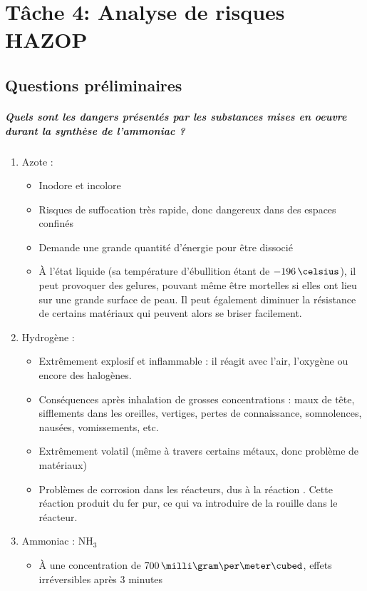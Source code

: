 \chapter{Tâche 4: Analyse de risques HAZOP}

\section{Questions préliminaires}
\paragraph{Quels sont les dangers présentés par les substances mises en oeuvre durant la synthèse de l'ammoniac ?}
\begin{enumerate}
\item Azote : 
\begin{itemize}
\item Inodore et incolore
\item Risques de suffocation très rapide, donc dangereux dans des espaces confinés
\item Demande une grande quantité d’énergie pour être dissocié
\item À l'état liquide (sa température d'ébullition étant de $-196\,\celsius$), il peut provoquer des gelures, pouvant même être mortelles si elles ont lieu sur une grande surface de peau. Il peut également diminuer la résistance de certains matériaux qui peuvent alors se briser facilement.
\end{itemize}
\item Hydrogène : 
\begin{itemize}
\item Extrêmement explosif et inflammable : il réagit avec l'air, l'oxygène ou encore des halogènes.
\item Conséquences après inhalation de grosses concentrations : maux de tête, sifflements dans les oreilles, vertiges, pertes de connaissance, somnolences,  nausées, vomissements, etc.
\item Extrêmement volatil (même à travers certains métaux, donc problème de matériaux)
\item Problèmes de corrosion dans les réacteurs, dus à la réaction
.
Cette réaction produit du fer pur, ce qui va introduire de la rouille dans le réacteur.
\end{itemize}
\item Ammoniac : NH$_3$
\begin{itemize}
\item À une concentration de $700\,\milli\gram\per\meter\cubed$, effets irréversibles après 3 minutes

\end{itemize}
\end{enumerate}
